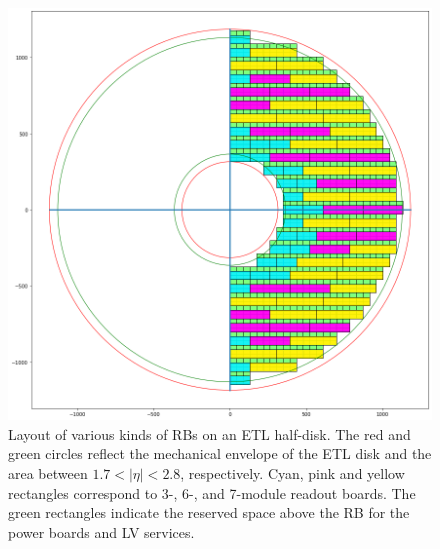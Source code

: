 \documentclass[11pt]{article}
\begin{document}
\begin{figure}[!h]
\centering
\includegraphics[width=\linewidth]{figures/coverage.png}
\caption{
Layout of various kinds of RBs on an ETL half-disk.
The red and green circles reflect the mechanical envelope of the ETL disk and the area between $1.7<|\eta|<2.8$, respectively.
Cyan, pink and yellow rectangles correspond to 3-, 6-, and 7-module readout boards.
The green rectangles indicate the reserved space above the RB for the power boards and LV services.
}
\label{fig:coverage}
\end{figure}
\end{document}
